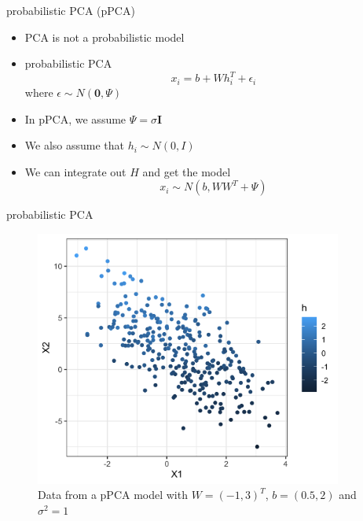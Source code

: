 \documentclass[10pt]{beamer}
\begin{document}

\begin{frame}{probabilistic PCA (pPCA)}

\begin{itemize}
\item PCA is not a {\color{uured} probabilistic model}\pause
\item probabilistic PCA
\[
x_i = b +  W h_i^T + \epsilon_i
\]
where $\epsilon \sim N(\mathbf{0}, \Psi)$
\item In pPCA, we assume $\Psi = \sigma \mathbf{I}$
\item We also assume that $h_i \sim N(0, I)$\pause
\item We can integrate out $H$ and get the model
\[
x_i \sim N(b, W W^T + \Psi)
\]
\end{itemize}

\end{frame}


\begin{frame}{probabilistic PCA}

\begin{figure}[h]
\centering
\includegraphics[width=0.9\textwidth]{fig/pPCA_h.png}
\caption{Data from a pPCA model with $W = (-1, 3)^T$, $b = (0.5, 2)$ and $\sigma^2 = 1$}
\end{figure}

\end{frame}
\end{document}
